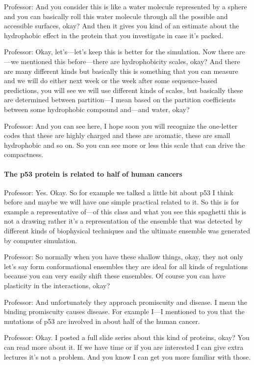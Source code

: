 Professor: And you consider this is like a water molecule represented by a sphere and you can basically roll this water molecule through all the possible and accessible surfaces, okay? And then it gives you kind of an estimate about the hydrophobic effect in the protein that you investigate in case it’s packed.

Professor: Okay, let’s—let’s keep this is better for the simulation. Now there are—we mentioned this before—there are hydrophobicity scales, okay? And there are many different kinds but basically this is something that you can measure and we will do either next week or the week after some sequence-based predictions, you will see we will use different kinds of scales, but basically these are determined between partition—I mean based on the partition coefficients between some hydrophobic compound and—and water, okay?

Professor: And you can see here, I hope soon you will recognize the one-letter codes that these are highly charged and these are aromatic, these are small hydrophobic and so on. So you can see more or less this scale that can drive the compactness.

\paragraph{The p53 protein is related to half of human cancers}
Professor: Yes. Okay. So for example we talked a little bit about p53 I think before and maybe we will have one simple practical related to it. So this is for example a representative of—of this class and what you see this spaghetti this is not a drawing rather it’s a representation of the ensemble that was detected by different kinds of biophysical techniques and the ultimate ensemble was generated by computer simulation.

Professor: So normally when you have these shallow things, okay, they not only let’s say form conformational ensembles they are ideal for all kinds of regulations because you can very easily shift these ensembles. Of course you can have plasticity in the interactions, okay?

Professor: And unfortunately they approach promiscuity and disease. I mean the binding promiscuity causes disease. For example I—I mentioned to you that the mutations of p53 are involved in about half of the human cancer.

Professor: Okay. I posted a full slide series about this kind of proteins, okay? You can read more about it. If we have time or if you are interested I can give extra lectures it’s not a problem. And you know I can get you more familiar with those.

